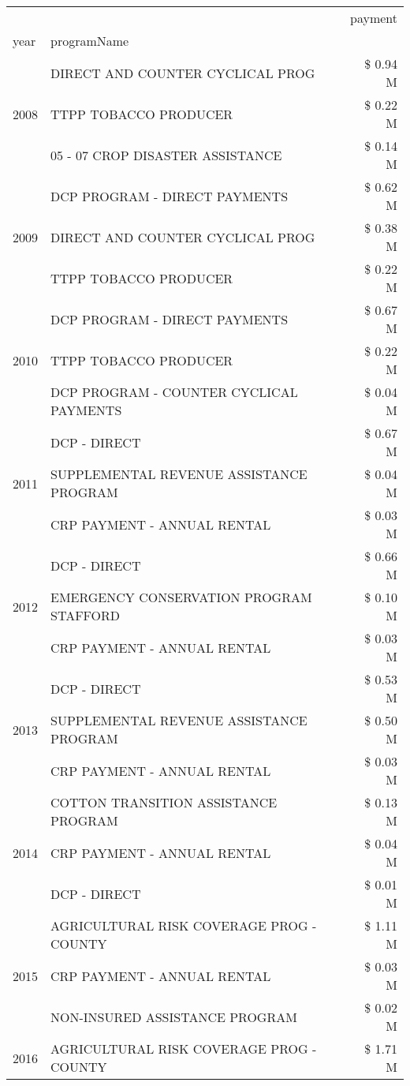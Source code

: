 \begin{tabular}{llr}
\toprule
 &  & payment \\
year & programName &  \\
\midrule
\multirow[t]{3}{*}{2008} & DIRECT AND COUNTER CYCLICAL PROG & \$ 0.94 M \\
 & TTPP TOBACCO PRODUCER & \$ 0.22 M \\
 & 05 - 07 CROP DISASTER ASSISTANCE & \$ 0.14 M \\
\cline{1-3}
\multirow[t]{3}{*}{2009} & DCP PROGRAM - DIRECT PAYMENTS & \$ 0.62 M \\
 & DIRECT AND COUNTER CYCLICAL PROG & \$ 0.38 M \\
 & TTPP TOBACCO PRODUCER & \$ 0.22 M \\
\cline{1-3}
\multirow[t]{3}{*}{2010} & DCP PROGRAM - DIRECT PAYMENTS & \$ 0.67 M \\
 & TTPP TOBACCO PRODUCER & \$ 0.22 M \\
 & DCP PROGRAM - COUNTER CYCLICAL PAYMENTS & \$ 0.04 M \\
\cline{1-3}
\multirow[t]{3}{*}{2011} & DCP - DIRECT & \$ 0.67 M \\
 & SUPPLEMENTAL REVENUE ASSISTANCE PROGRAM & \$ 0.04 M \\
 & CRP PAYMENT - ANNUAL RENTAL & \$ 0.03 M \\
\cline{1-3}
\multirow[t]{3}{*}{2012} & DCP - DIRECT & \$ 0.66 M \\
 & EMERGENCY CONSERVATION PROGRAM STAFFORD & \$ 0.10 M \\
 & CRP PAYMENT - ANNUAL RENTAL & \$ 0.03 M \\
\cline{1-3}
\multirow[t]{3}{*}{2013} & DCP - DIRECT & \$ 0.53 M \\
 & SUPPLEMENTAL REVENUE ASSISTANCE PROGRAM & \$ 0.50 M \\
 & CRP PAYMENT - ANNUAL RENTAL & \$ 0.03 M \\
\cline{1-3}
\multirow[t]{3}{*}{2014} & COTTON TRANSITION ASSISTANCE PROGRAM & \$ 0.13 M \\
 & CRP PAYMENT - ANNUAL RENTAL & \$ 0.04 M \\
 & DCP - DIRECT & \$ 0.01 M \\
\cline{1-3}
\multirow[t]{3}{*}{2015} & AGRICULTURAL RISK COVERAGE PROG - COUNTY & \$ 1.11 M \\
 & CRP PAYMENT - ANNUAL RENTAL & \$ 0.03 M \\
 & NON-INSURED ASSISTANCE PROGRAM & \$ 0.02 M \\
\cline{1-3}
\multirow[t]{3}{*}{2016} & AGRICULTURAL RISK COVERAGE PROG - COUNTY & \$ 1.71 M \\

\end{tabular}
